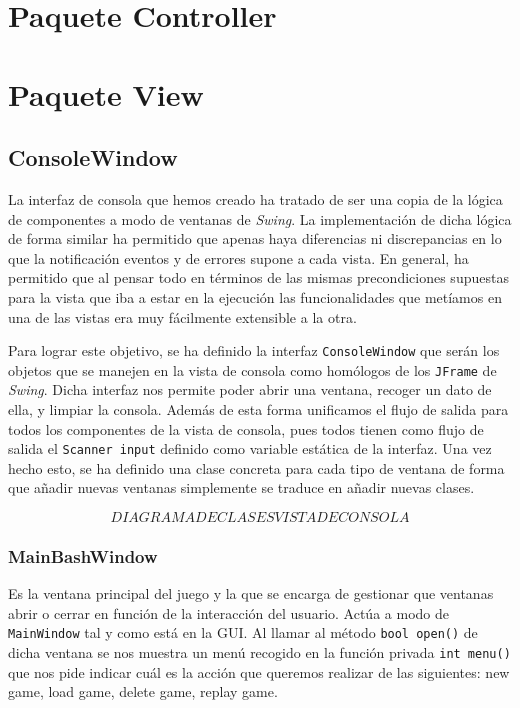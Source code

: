 \documentclass[12pt,a4paper,openright]{book}
\theoremstyle{break}
\begin{document}
\newpage

\section{Paquete Controller}

\section{Paquete View}
\subsection{ConsoleWindow}
La interfaz de consola que hemos creado ha tratado de ser una copia de la lógica de componentes a modo de ventanas de \textit{Swing}. La implementación de dicha lógica de forma similar ha permitido que apenas haya diferencias ni discrepancias en lo que la notificación eventos y de errores supone a cada vista. En general, ha permitido que al pensar todo en términos de las mismas precondiciones supuestas para la vista que iba a estar en la ejecución las funcionalidades que metíamos en una de las vistas era muy fácilmente extensible a la otra.

Para lograr este objetivo, se ha definido la interfaz \texttt{ConsoleWindow} que serán los objetos que se manejen en la vista de consola como homólogos de los \texttt{JFrame} de \textit{Swing}. Dicha interfaz nos permite poder abrir una ventana, recoger un dato de ella, y limpiar la consola. Además de esta forma unificamos el flujo de salida para todos los componentes de la vista de consola, pues todos tienen como flujo de salida el \texttt{Scanner input} definido como variable estática de la interfaz. Una vez hecho esto, se ha definido una clase concreta para cada tipo de ventana de forma que añadir nuevas ventanas simplemente se traduce en añadir nuevas clases.

$$DIAGRAMA DE CLASES VISTA DE CONSOLA$$

\subsubsection{MainBashWindow}
Es la ventana principal del juego y la que se encarga de gestionar que ventanas abrir o cerrar en función de la interacción del usuario. Actúa a modo de \texttt{MainWindow} tal y como está en la GUI. Al llamar al método \texttt{bool open()} de dicha ventana se nos muestra un menú recogido en la función privada \texttt{int menu()} que nos pide indicar cuál es la acción que queremos realizar de las siguientes: new game, load game, delete game, replay game.
\end{document}
